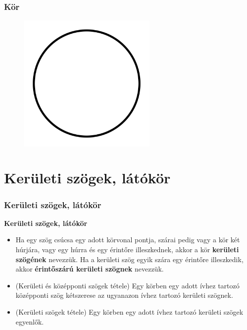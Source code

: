 \documentclass[11pt]{beamer}
\begin{document}
\begin{frame}
\frametitle{Kör}
\begin{figure}
  \includegraphics[width=0.6\textwidth]{circle.png}
\end{figure}
\end{frame}

\section{\textbf{Kerületi szögek, látókör}}
\begin{frame}[<+->]
\frametitle{Kerületi szögek, látókör}
\begin{block}{\textbf{Kerületi szögek, látókör}}
\begin{itemize}[label=$\circ$]
\item Ha egy szög csúcsa egy adott körvonal pontja, szárai pedig vagy a kör két húrjára, vagy egy húrra és egy érintőre illeszkednek, akkor a kör \textbf{kerületi szögének} nevezzük. Ha a kerületi szög egyik szára egy érintőre illeszkedik, akkor \textbf{érintőszárú kerületi szögnek} nevezzük.
\item (Kerületi és középponti szögek tétele) Egy körben egy adott ívhez tartozó középponti szög kétszerese az ugyanazon ívhez tartozó kerületi szögnek.
\item (Kerületi szögek tétele) Egy körben egy adott ívhez tartozó kerületi szögek egyenlők.
\end{itemize}
\end{block}
\end{frame}
\end{document}

